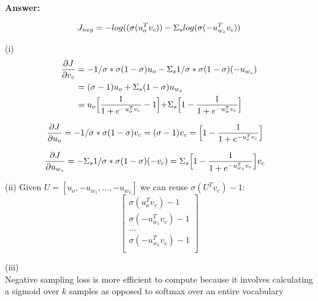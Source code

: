 \documentclass{article}
\newenvironment{answer}{
    {\bf Answer:} \sf \begingroup\color{black}
}{\endgroup}%
\begin{document}
\begin{enumerate}[label=(\alph*)]
\begin{shaded}
\begin{answer}
\begin{equation}
    J_{neg} = -log((\sigma(u_o^T v_c)) - \Sigma_s log(\sigma(-u_{w_s}^T v_c)) \\    
\end{equation}

(i)
\begin{equation}
\begin{split}
\frac{\partial J}{\partial v_c}
&= -1/\sigma * \sigma(1 - \sigma) u_o - \Sigma_s 1/\sigma *  \sigma(1 - \sigma) (-u_{w_s}) \\
&= (\sigma - 1) u_o + \Sigma_s (1 - \sigma) u_{w_s} \\
&= u_o \Bigl[ \frac{1}{1 + e^{-u_o^T v_c}} - 1 \Bigl] + \Sigma_s \Bigl[ 1 - \frac{1}{1 + e^{-u_w^T v_c}} \Bigl]
\end{split}
\end{equation}

\begin{equation}
\begin{split}
\frac{\partial J}{\partial u_o}
&= -1/\sigma * \sigma(1 - \sigma) v_c = (\sigma - 1) v_c = \Bigl[ 1 - \frac{1}{1 + e^{-u_o^T v_c}} \Bigl]
\end{split}
\end{equation}

\begin{equation}
\begin{split}
    \frac{\partial J}{\partial u_{w_s}}
    &= - \Sigma_s 1/\sigma * \sigma(1 - \sigma) (-v_c) = \Sigma_s \Bigl[ 1 - \frac{1}{1 + e^{-u_{w_s}^T v_c}} \Bigl] v_c
\end{split}
\end{equation}

(ii)
Given $U=[u_o, -u_{w_1}, \ldots, -u_{w_k}]$ we can reuse $\sigma(U^Tv_c) - 1$:
$$
\left[
    \begin{array}{c}
        \sigma(u_o^Tv_c) - 1 \\
        \sigma(-u_{w_1}^Tv_c) - 1 \\
        \dots \\
        \sigma(-u_{w_k}^Tv_c) - 1 \\
    \end{array}
\right]
$$

(iii) \\
Negative sampling loss is more efficient to compute because it involves calculating a sigmoid over $k$ samples as opposed to softmax over an entire vocabulary


\end{answer}
\end{shaded}
\end{enumerate}
\end{document}
